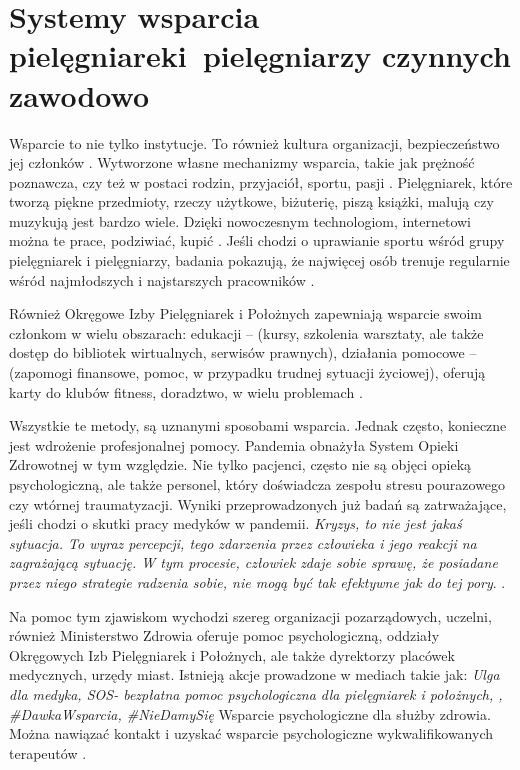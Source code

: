 \documentclass[a4paper,12pt,twoside,openright]{mwrep}
\begin{document}
\section{Systemy wsparcia pielęgniarek\newline i~pielęgniarzy czynnych zawodowo}
\label{sectionSystemyWsparcia}
Wsparcie to nie tylko instytucje. To również kultura organizacji, bezpieczeństwo jej członków \cite{bezpieczenstwo}. Wytworzone własne mechanizmy wsparcia, takie jak  prężność poznawcza, czy też w postaci  rodzin, przyjaciół, sportu, pasji \cite{preznosc}. Pielęgniarek, które tworzą piękne przedmioty, rzeczy użytkowe, biżuterię, piszą książki, malują czy muzykują  jest bardzo wiele. Dzięki nowoczesnym technologiom, internetowi można te prace, podziwiać, kupić \cite{talent}. Jeśli chodzi o uprawianie sportu wśród grupy pielęgniarek i pielęgniarzy, badania pokazują, że najwięcej osób trenuje regularnie wśród najmłodszych i najstarszych pracowników \cite{sport}.

Również Okręgowe Izby Pielęgniarek i Położnych zapewniają wsparcie swoim członkom w wielu obszarach: edukacji – (kursy, szkolenia warsztaty, ale także dostęp do bibliotek wirtualnych, serwisów prawnych), działania pomocowe – (zapomogi finansowe, pomoc, w przypadku trudnej sytuacji życiowej), oferują karty do klubów fitness, doradztwo, w wielu problemach \cite{izby}.

Wszystkie te metody, są uznanymi sposobami wsparcia. Jednak często, konieczne jest wdrożenie profesjonalnej pomocy. Pandemia obnażyła System Opieki Zdrowotnej w tym względzie. Nie tylko pacjenci, często nie są objęci opieką psychologiczną, ale także personel, który doświadcza zespołu stresu pourazowego czy wtórnej traumatyzacji.  Wyniki przeprowadzonych już badań są zatrważające, jeśli chodzi o skutki pracy medyków w pandemii. \textit{Kryzys, to nie jest jakaś sytuacja. To wyraz percepcji, tego zdarzenia przez człowieka i jego reakcji na zagrażającą sytuację. W tym procesie, człowiek zdaje sobie sprawę, że posiadane przez niego strategie radzenia sobie, nie mogą być tak efektywne jak do tej pory}. \cite{covid}.

Na pomoc tym zjawiskom wychodzi szereg organizacji pozarządowych, uczelni, również Ministerstwo Zdrowia oferuje pomoc psychologiczną, oddziały Okręgowych Izb Pielęgniarek i Położnych, ale także dyrektorzy placówek medycznych, urzędy miast. Istnieją akcje prowadzone w mediach takie jak: \textit{Ulga dla medyka, SOS- bezpłatna pomoc psychologiczna dla pielęgniarek i położnych, , \#DawkaWsparcia, \#NieDamySię} Wsparcie psychologiczne dla służby zdrowia. Można nawiązać kontakt i uzyskać wsparcie psychologiczne wykwalifikowanych terapeutów \cite{jak}.
\end{document}
